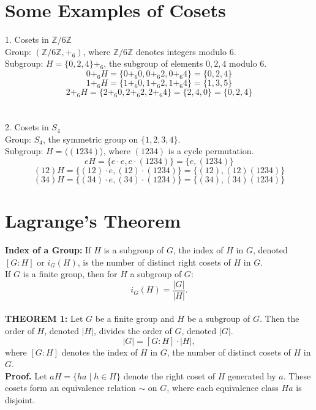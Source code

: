 \section{Some Examples of Cosets}
1. Cosets in $\mathbb{Z}/6\mathbb{Z}$\\
{Group:} $(\mathbb{Z}/6\mathbb{Z}, +_6)$, where $\mathbb{Z}/6\mathbb{Z}$ denotes integers modulo $6$.
\\
{Subgroup:} $H = \{0, 2, 4\} +_6$, the subgroup of elements $0, 2, 4$ modulo $6$.
\[ 0 +_6 H = \{ 0 +_6 0, 0 +_6 2, 0 +_6 4 \} = \{ 0, 2, 4 \} \]
\[ 1 +_6 H = \{ 1 +_6 0, 1 +_6 2, 1 +_6 4 \} = \{ 1, 3, 5 \} \]
\[ 2 +_6 H = \{ 2 +_6 0, 2 +_6 2, 2 +_6 4 \} = \{ 2, 4, 0 \} = \{ 0, 2, 4 \} \]
\\\\
2. Cosets in $S_4$
\\
{Group:} $S_4$, the symmetric group on $\{1, 2, 3, 4\}$.
\\
{Subgroup:} $H = \langle (1234) \rangle$, where $(1234)$ is a cycle permutation.
\[ eH = \{ e \cdot e, e \cdot (1234) \} = \{ e, (1234) \} \]
\[ (12)H = \{ (12) \cdot e, (12) \cdot (1234) \} = \{ (12), (12)(1234) \} \]
\[ (34)H = \{ (34) \cdot e, (34) \cdot (1234) \} = \{ (34), (34)(1234) \} \]





\section{Lagrange's Theorem}

\textbf{Index of a Group: } If \( H \) is a subgroup of \( G \), the index of \( H \) in \( G \), denoted \( [G : H] \) or \( i_G(H) \), is the number of distinct right cosets of \( H \) in \( G \).\\
If \( G \) is a finite group, then for \( H \) a subgroup of \( G \):
\[ i_G(H) = \frac{|G|}{|H|}. \]
\\
\textbf{THEOREM 1:} Let \( G \) be a finite group and \( H \) be a subgroup of \( G \). Then the order of \( H \), denoted \( |H| \), divides the order of \( G \), denoted \( |G| \).
\[ |G| = [G : H] \cdot |H|, \]
where \( [G : H] \) denotes the index of \( H \) in \( G \), the number of distinct cosets of \( H \) in \( G \).\\
\textbf{Proof.}
Let \( aH = \{ ha \mid h \in H \} \) denote the right coset of \( H \) generated by \( a \). These cosets form an equivalence relation \( \sim \) on \( G \), where each equivalence class \( Ha \) is disjoint. 

